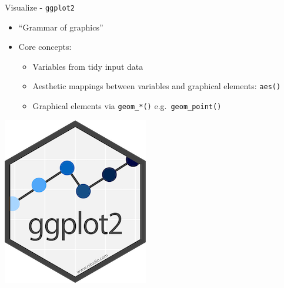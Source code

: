 \documentclass[
  ignorenonframetext,
]{beamer}
\providecommand{\tightlist}{%
  \setlength{\itemsep}{0pt}\setlength{\parskip}{0pt}}
\begin{document}
\begin{frame}[fragile]{Visualize - \texttt{ggplot2}}
\protect\hypertarget{visualize---ggplot2}{}
\begin{itemize}
\tightlist
\item
  ``Grammar of graphics''
\item
  Core concepts:

  \begin{itemize}
  \tightlist
  \item
    Variables from tidy input data
  \item
    Aesthetic mappings between variables and graphical elements:
    \texttt{aes()}
  \item
    Graphical elements via \texttt{geom\_*()}
    e.g.~\texttt{geom\_point()}
  \end{itemize}
\end{itemize}

\includegraphics[width=0.9\linewidth]{images/ggplot2}
\end{frame}
\end{document}
